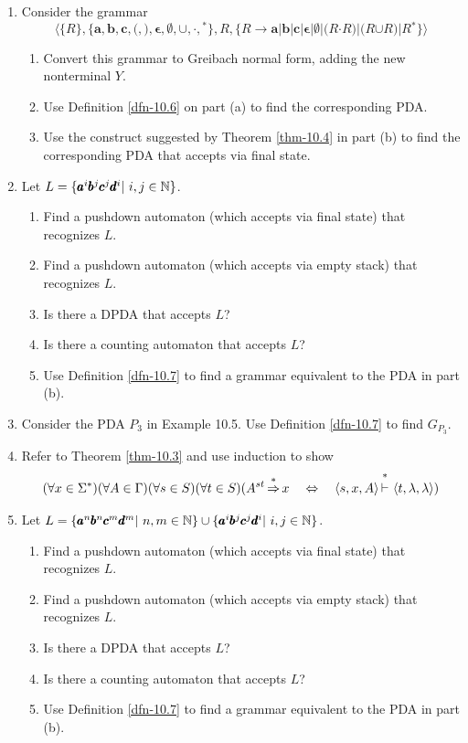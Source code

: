 \begin{enumerate}[{10.}1.]
\item Consider the grammar
\[ \langle\{R\},\{\pmb{a},\pmb{b},\pmb{c},\pmb{(},\pmb{)},\pmb{\epsilon},
	\pmb{\emptyset},\pmb{\cup},\pmb{\cdot},\pmb{^*}\},R,\{R\rightarrow
	\pmb{a}|\pmb{b}|\pmb{c}|\pmb{\epsilon}|\pmb{\emptyset}|\pmb{(}R
	\pmb{\cdot}R\pmb{)}|\pmb{(}R\pmb{\cup}R\pmb{)}|R\pmb{^*}\}\rangle \]
\begin{enumerate}
\item Convert this grammar to Greibach normal form, adding the new nonterminal
$Y$.
\item Use Definition \ref{dfn-10.6} on part (a) to find the corresponding PDA.
\item Use the construct suggested by Theorem \ref{thm-10.4} in part (b) to find the
corresponding PDA that accepts via final state.
\end{enumerate}

\item Let $L=\{\pmb{a}^i\pmb{b}^j\pmb{c}^	j\pmb{d}^i|\ i,j\in\NN\}$.
\begin{enumerate}
\item Find a pushdown automaton (which accepts via final state) that recognizes
$L$.
\item Find a pushdown automaton (which accepts via empty stack) that recognizes
$L$.
\item Is there a DPDA that accepts $L$?
\item Is there a counting automaton that accepts $L$?
\item Use Definition \ref{dfn-10.7} to find a grammar equivalent to the PDA in part (b).
\end{enumerate}

\item Consider the PDA $P_3$ in Example 10.5. Use Definition \ref{dfn-10.7} to find
$G_{P_3}$.

\item Refer to Theorem \ref{thm-10.3} and use induction to show
\[ (\forall x\in\Sigma^*)(\forall A\in\Gamma)(\forall s\in S)(\forall t\in S)
	(A^{st} \DRightarrow x\ \ \  \Leftrightarrow\ \ \  \langle s,x,A\rangle\Dvdash\langle
	t,\lambda,\lambda\rangle) \]

\item Let $L=\{\pmb{a}^n\pmb{b}^n\pmb{c}^m\pmb{d}^m|\ n,m\in\NN\}\cup\{\pmb{a}^i
\pmb{b}^j\pmb{c}^j\pmb{d}^i|\ i,j\in\NN\}$.
\begin{enumerate}
\item Find a pushdown automaton (which accepts via final state) that recognizes
$L$.
\item Find a pushdown automaton (which accepts via empty stack) that recognizes
$L$.
\item Is there a DPDA that accepts $L$?
\item Is there a counting automaton that accepts $L$?
\item Use Definition \ref{dfn-10.7} to find a grammar equivalent to the PDA in part (b).
\end{enumerate}


\end{enumerate}
